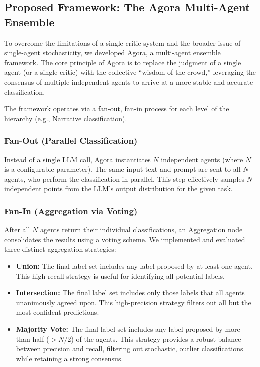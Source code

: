 \subsection{Proposed Framework: The Agora Multi-Agent Ensemble}

To overcome the limitations of a single-critic system and the broader issue of single-agent stochasticity, we developed Agora, a multi-agent ensemble framework. The core principle of Agora is to replace the judgment of a single agent (or a single critic) with the collective ``wisdom of the crowd,'' leveraging the consensus of multiple independent agents to arrive at a more stable and accurate classification.

The framework operates via a fan-out, fan-in process for each level of the hierarchy (e.g., Narrative classification).

\subsubsection{Fan-Out (Parallel Classification)}

Instead of a single LLM call, Agora instantiates $N$ independent agents (where $N$ is a configurable parameter). The same input text and prompt are sent to all $N$ agents, who perform the classification in parallel. This step effectively samples $N$ independent points from the LLM's output distribution for the given task.

\subsubsection{Fan-In (Aggregation via Voting)}

After all $N$ agents return their individual classifications, an Aggregation node consolidates the results using a voting scheme. We implemented and evaluated three distinct aggregation strategies:

\begin{itemize}
\item \textbf{Union:} The final label set includes any label proposed by at least one agent. This high-recall strategy is useful for identifying all potential labels.

\item \textbf{Intersection:} The final label set includes only those labels that all agents unanimously agreed upon. This high-precision strategy filters out all but the most confident predictions.

\item \textbf{Majority Vote:} The final label set includes any label proposed by more than half ($> N/2$) of the agents. This strategy provides a robust balance between precision and recall, filtering out stochastic, outlier classifications while retaining a strong consensus.
\end{itemize}

